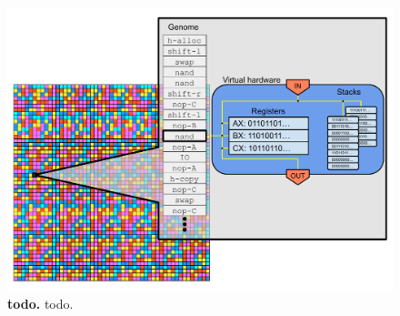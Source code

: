 \begin{figure}[h!]
    \centering
    \includegraphics[width=\textwidth]{media/avida-hardware.pdf}
    \caption{\small
    \textbf{todo.}
    todo.
    }
    \label{fig:avida-virtual-hardware}
\end{figure}

